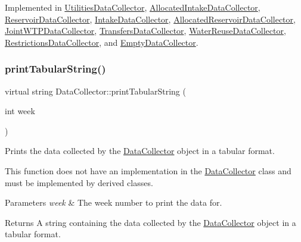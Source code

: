 Implemented in \mbox{\hyperlink{classUtilitiesDataCollector_ab3409c407783fd4451f310d2fc177b22}{Utilities\+Data\+Collector}}, \mbox{\hyperlink{classAllocatedIntakeDataCollector_a995c69f6e2fe615786b2b26fd349c6cb}{Allocated\+Intake\+Data\+Collector}}, \mbox{\hyperlink{classReservoirDataCollector_aa8346433f037bbca41f3c8450f7f88cf}{Reservoir\+Data\+Collector}}, \mbox{\hyperlink{classIntakeDataCollector_a42d56dd08e57a7e6e48812a2ab522439}{Intake\+Data\+Collector}}, \mbox{\hyperlink{classAllocatedReservoirDataCollector_adbedebdf593bee81447671fb8f6ef2fe}{Allocated\+Reservoir\+Data\+Collector}}, \mbox{\hyperlink{classJointWTPDataCollector_a42bacc8ab8cc78e38715966c8dbe8de9}{Joint\+W\+T\+P\+Data\+Collector}}, \mbox{\hyperlink{classTransfersDataCollector_a29750b8b76fa82d70d4f472a0e36ceba}{Transfers\+Data\+Collector}}, \mbox{\hyperlink{classWaterReuseDataCollector_afef08bead3f2c60c2b9c975864456ef1}{Water\+Reuse\+Data\+Collector}}, \mbox{\hyperlink{classRestrictionsDataCollector_ad36ff12a666d72c92893c918715628f6}{Restrictions\+Data\+Collector}}, and \mbox{\hyperlink{classEmptyDataCollector_a345d478e92af2ab4bcbaeeae3c7a3faa}{Empty\+Data\+Collector}}.

\mbox{\label{classDataCollector_a397fccabe0223267eea8fc7cac0e59da}} 
\subsubsection{\texorpdfstring{print\+Tabular\+String()}{printTabularString()}}
{\footnotesize\ttfamily virtual string Data\+Collector\+::print\+Tabular\+String (\begin{DoxyParamCaption}\item[{int}]{week }\end{DoxyParamCaption})\hspace{0.3cm}{\ttfamily [pure virtual]}}



Prints the data collected by the \mbox{\hyperlink{classDataCollector}{Data\+Collector}} object in a tabular format. 

This function does not have an implementation in the \mbox{\hyperlink{classDataCollector}{Data\+Collector}} class and must be implemented by derived classes.


\begin{DoxyParams}{Parameters}
{\em week} & The week number to print the data for. \\
\hline
\end{DoxyParams}
\begin{DoxyReturn}{Returns}
A string containing the data collected by the \mbox{\hyperlink{classDataCollector}{Data\+Collector}} object in a tabular format. 
\end{DoxyReturn}


